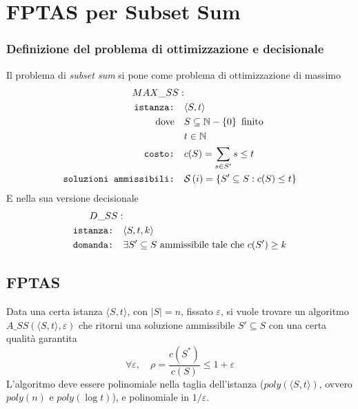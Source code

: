 \section{FPTAS per Subset Sum}

\subsubsection{Definizione del problema di ottimizzazione e decisionale}

Il problema di \emph{subset sum} si pone come problema di ottimizzazione di massimo
\begin{align*}
    MAX\_SS: & \\
    \texttt{istanza:} \quad &
    \langle S,t \rangle
    \\
    \text{dove} \quad & S \subseteq \mathbb{N} - \left\{ 0 \right\} \text{ finito} \\
    & t \in \mathbb{N} \\
    \texttt{costo:} \quad &
    c(S) = \sum_{s \in S'} s \leq t \\
    \texttt{soluzioni ammissibili:} \quad &
    \mathcal{S} \left( i \right)
    =
    \left\{ 
        S' \subseteq S : c(S) \leq t
    \right\}
\end{align*}
E nella sua versione decisionale
\begin{align*}
    D\_SS: & \\
    \texttt{istanza:} \quad & \langle S,t,k \rangle \\
    \texttt{domanda:} \quad &
    \exists
    S' \subseteq S
    \text{ ammissibile
    tale che } c(S') \geq k
\end{align*}

\subsection{FPTAS}

Data una certa istanza $
\langle S,t \rangle
$, con $|S|=n$, fissato $\varepsilon$, si vuole trovare un algoritmo $
A\_SS (
\langle S,t \rangle
, \varepsilon )
$ che ritorni una soluzione ammissibile $
S' \subseteq S
$ con una certa qualità garantita
\begin{equation*}
    \forall \varepsilon,
    \quad
    \rho = \frac{
        c(S^*)
    }{
        c(S)
    } \leq 1 + \varepsilon
\end{equation*}
L'algoritmo deve essere polinomiale nella taglia dell'istanza ($
poly (
\langle S,t \rangle
)
$, ovvero $ poly(n) $ e $poly( \log t)$), e polinomiale in $1/\varepsilon$.

